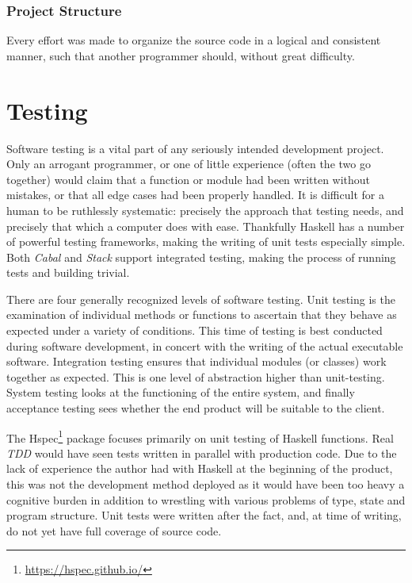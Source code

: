 \documentclass[12pt, a4paper]{report}
\begin{document}
\subsection{Project Structure}
Every effort was made to organize the source code in a logical and consistent manner, such that
another programmer should, without great difficulty.

\chapter{Testing}

Software testing is a vital part of any seriously intended development project. Only an arrogant
programmer, or one of little experience (often the two go together) would claim that a function or
module had been written without mistakes, or that all edge cases had been properly handled. It is
difficult for a human to be ruthlessly systematic: precisely the approach that testing needs, and
precisely that which a computer does with ease. Thankfully Haskell has a number of powerful testing
frameworks, making the writing of unit tests especially simple. Both \textit{Cabal} and
\textit{Stack} support integrated testing, making the process of running tests and building trivial.

There are four generally recognized levels of software testing. Unit testing is the examination of
individual methods or functions to ascertain that they behave as expected under a variety of
conditions. This time of testing is best conducted during software development, in concert with the
writing of the actual executable software. Integration testing ensures that individual modules (or
classes) work together as expected. This is one level of abstraction higher than unit-testing.
System testing looks at the functioning of the entire system, and finally acceptance testing sees
whether the end product will be suitable to the client. 

The Hspec\footnote{\url{https://hspec.github.io/}} package focuses primarily on unit testing of
Haskell functions. Real \textit{TDD} would have seen tests written in parallel with production code.
Due to the lack of experience the author had with Haskell at the beginning of the product, this was
not the development method deployed as it would have been too heavy a cognitive burden in addition
to wrestling with various problems of type, state and program structure. Unit tests were written
after the fact, and, at time of writing, do not yet have full coverage of source code.
\end{document}
